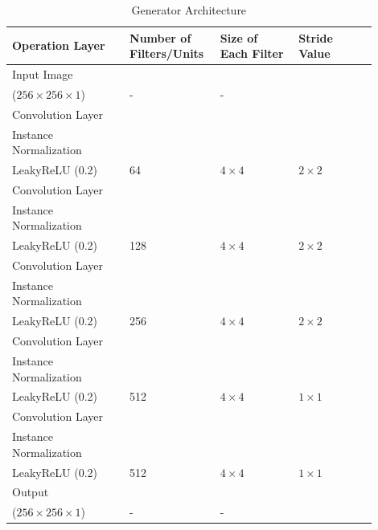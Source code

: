 \begin{table}[H]
    \centering

    \begin{tabular}{P{0.30\linewidth} P{0.20\linewidth} P{0.20\linewidth} P{0.20\linewidth}} 
        \toprule
        Operation Layer & Number of Filters/Units  & Size of Each Filter & Stride Value\\
        \toprule
        \toprule
        Input Image \\($256 \times 256 \times 1$) & - & - \\
        \midrule
        Convolution Layer\\Instance Normalization\\LeakyReLU (0.2) & 64 & $4 \times 4$ & $2 \times 2$\\
        \midrule
        Convolution Layer\\Instance Normalization\\LeakyReLU (0.2) & 128 & $4 \times 4$ & $2 \times 2$\\
        \midrule
        Convolution Layer\\Instance Normalization\\LeakyReLU (0.2) & 256 & $4 \times 4$ & $2 \times 2$\\
        \midrule
        Convolution Layer\\Instance Normalization\\LeakyReLU (0.2) & 512 & $4 \times 4$ & $1 \times 1$\\
        \midrule
        Convolution Layer\\Instance Normalization\\LeakyReLU (0.2) & 512 & $4 \times 4$ & $1 \times 1$\\
        \midrule
        \midrule
        Output  \\($256 \times 256 \times 1$) & - & - \\
        \bottomrule
    \end{tabular}
    \caption[Generator Architecture]{Generator Architecture}
    \label{table:GeneratorArchitecture}
\end{table}



